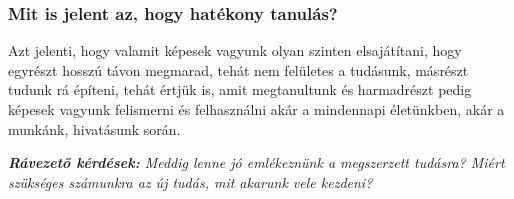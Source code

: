 \documentclass[../Main.tex]{subfiles}
\begin{document}
\subsubsection{Mit is jelent az, hogy hatékony tanulás?}

\begin{flushleft}
    Azt jelenti, hogy valamit képesek vagyunk olyan szinten elsajátítani, hogy egyrészt hosszú távon megmarad,
    tehát nem felületes a tudásunk, másrészt tudunk rá építeni, tehát értjük is,
    amit megtanultunk és harmadrészt pedig képesek vagyunk felismerni és felhasználni akár a mindennapi életünkben,
    akár a munkánk, hivatásunk során.
\end{flushleft}

\textit{\textbf{Rávezető kérdések:} Meddig lenne jó emlékeznünk a megszerzett tudásra? Miért szükséges számunkra az új tudás, mit akarunk vele kezdeni?}
\end{document}
